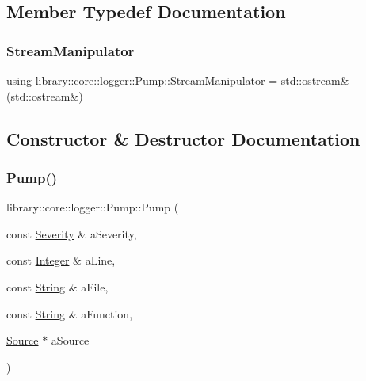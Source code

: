 \subsection{Member Typedef Documentation}
\mbox{\label{classlibrary_1_1core_1_1logger_1_1Pump_ab8990ff21e57c39977af471ddeb57637}} 
\subsubsection{\texorpdfstring{Stream\+Manipulator}{StreamManipulator}}
{\footnotesize\ttfamily using \hyperlink{classlibrary_1_1core_1_1logger_1_1Pump_ab8990ff21e57c39977af471ddeb57637}{library\+::core\+::logger\+::\+Pump\+::\+Stream\+Manipulator} =  std\+::ostream\&(std\+::ostream\&)}



\subsection{Constructor \& Destructor Documentation}
\mbox{\label{classlibrary_1_1core_1_1logger_1_1Pump_af5c515afe6d1ca6c4f388235d4a79562}} 
\subsubsection{\texorpdfstring{Pump()}{Pump()}\hspace{0.1cm}{\footnotesize\ttfamily [1/3]}}
{\footnotesize\ttfamily library\+::core\+::logger\+::\+Pump\+::\+Pump (\begin{DoxyParamCaption}\item[{const \hyperlink{namespacelibrary_1_1core_1_1logger_a35f71353edf64f68f7fe3874b01abaa8}{Severity} \&}]{a\+Severity,  }\item[{const \hyperlink{classlibrary_1_1core_1_1types_1_1Integer}{Integer} \&}]{a\+Line,  }\item[{const \hyperlink{classlibrary_1_1core_1_1types_1_1String}{String} \&}]{a\+File,  }\item[{const \hyperlink{classlibrary_1_1core_1_1types_1_1String}{String} \&}]{a\+Function,  }\item[{\hyperlink{classlibrary_1_1core_1_1logger_1_1Source}{Source} $\ast$}]{a\+Source }\end{DoxyParamCaption})}

